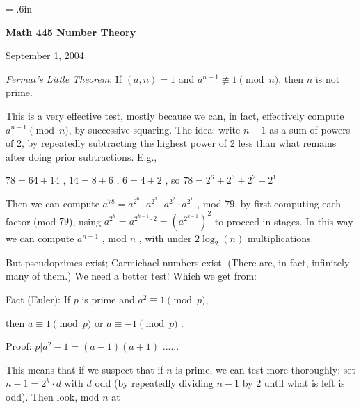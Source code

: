 




\nopagenumbers
\parindent=-20pt
\voffset=-.6in


\def\ctln{\centerline}
\def\u{\underbar}


\ctln{\bf Math 445 Number Theory}

\medskip

\ctln{September 1, 2004}

\bigskip

{\it Fermat's Little Theorem}: If $(a,n)=1$ and 
$a^{n-1}\not\equiv 1 \pmod{n}$, then $n$ is not prime.

\medskip

This is a very effective test, mostly because we can, in fact,
effectively compute $a^{n-1} \pmod{n}$, by successive squaring.
The idea: write $n-1$ as a sum of powers of 2, by repeatedly 
subtracting the highest power of 2 less than what remains
after doing prior subtractions. E.g.,

\smallskip

$78 = 64+14$ , $14=8+6$ , $6=4+2$ , so $78 = 2^6+2^3+2^2+2^1$ 

\smallskip

Then we can compute $a^{78}=a^{2^6}\cdot a^{2^3}\cdot a^{2^2}\cdot a^{2^1}$ , mod $79$, 
by first computing each factor (mod $79$), using $a^{2^k}=a^{2^{k-1}\cdot 2}=(a^{2^{k-1}})^2$
to proceed in stages. In this way we can compute $a^{n-1}$ , mod $n$ , with under $2\log_2(n)$
multiplications.

\medskip

But pseudoprimes exist; Carmichael numbers exist. (There are, in fact, infinitely many of them.)
We need a better test! Which we get from:

\medskip

Fact (Euler): If $p$ is prime and $a^2\equiv 1\pmod{p}$, 


\hfill then $a\equiv 1\pmod{p}$ or $a\equiv -1\pmod{p}$ .

\smallskip

Proof: $p|a^2-1 = (a-1)(a+1)$ ......

\medskip

This means that if we suspect that if $n$ is prime, we can test more thoroughly; 
set $n-1=2^k\cdot d$ with $d$ odd (by repeatedly dividing $n-1$ by 2 until what 
is left is odd). Then look, mod $n$ at

\medskip

